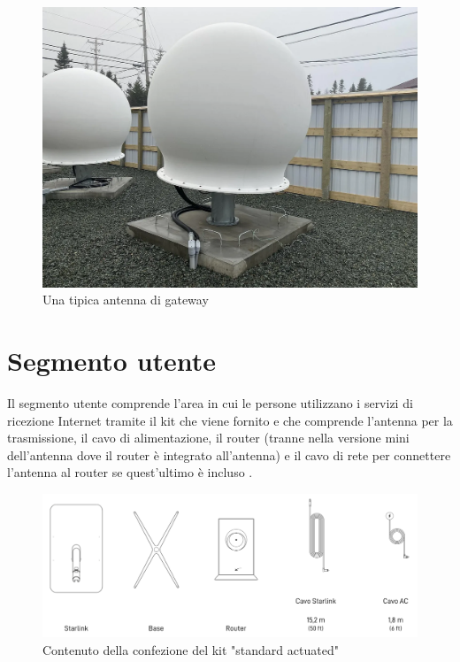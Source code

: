 \begin{figure}[htbp]
  \centering
  \includegraphics[width=0.9\linewidth]{./res/img/starlink_gateway_near.png}
  \caption{Una tipica antenna di gateway \cite{mike_puchol_modeling_2022}}
  \label{fig:starlink-gateway-near}
\end{figure}

\section{Segmento utente}
Il segmento utente comprende l'area in cui le persone utilizzano i servizi di ricezione Internet tramite il kit che viene fornito e che comprende l'antenna per la trasmissione, il cavo di alimentazione, il router (tranne nella versione mini dell'antenna dove il router è integrato all'antenna) e il cavo di rete per connettere l'antenna al router se quest'ultimo è incluso \cite{branch_education_how_2022}.

\begin{figure}[htbp]
  \centering
  \includegraphics[width=0.8\linewidth]{./res/img/starlink_kit_standard.png}
  \caption{Contenuto della confezione del kit "standard actuated" \cite{starlink_specifiche_nodate}}
  \label{fig:starlink-kit-standard}
\end{figure}

